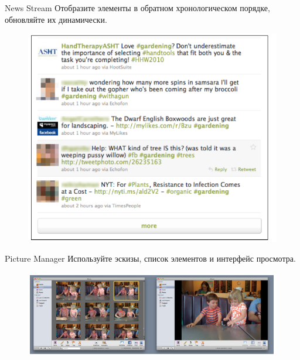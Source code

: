 \documentclass{beamer}
\begin{document}
\begin{frame}[t]{News Stream}
	Отобразите элементы в обратном хронологическом порядке, обновляйте их динамически.
	\begin{figure}[h]
		\centering
		\includegraphics[scale=0.45]{images/lec07-pic04.png}
	\end{figure}
\end{frame} 

\begin{frame}[t]{Picture Manager}
	Используйте эскизы, список элементов и интерфейс просмотра.
	\begin{figure}[h]
		\centering
		\includegraphics[scale=0.6]{images/lec07-pic06.png}
	\end{figure}
\end{frame} 
\end{document}
